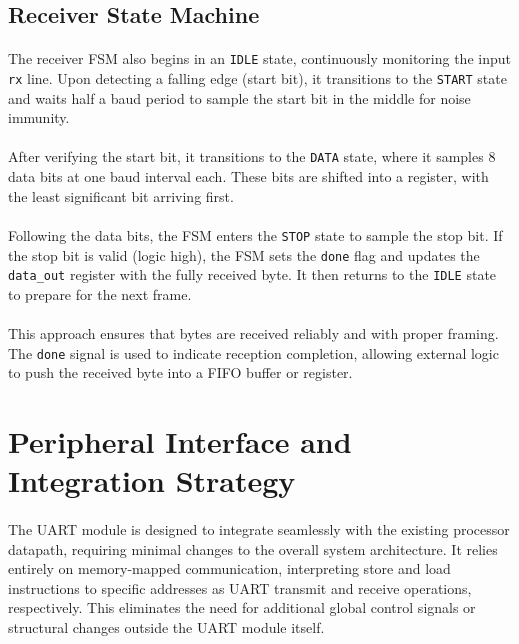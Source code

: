 \documentclass[12pt]{report}
\begin{document}
\subsection{Receiver State Machine}

\paragraph{}
The receiver FSM also begins in an \texttt{IDLE} state, continuously monitoring the input \texttt{rx} line. Upon detecting a falling edge (start bit), it transitions to the \texttt{START} state and waits half a baud period to sample the start bit in the middle for noise immunity.

\paragraph{}
After verifying the start bit, it transitions to the \texttt{DATA} state, where it samples 8 data bits at one baud interval each. These bits are shifted into a register, with the least significant bit arriving first.

\paragraph{}
Following the data bits, the FSM enters the \texttt{STOP} state to sample the stop bit. If the stop bit is valid (logic high), the FSM sets the \texttt{done} flag and updates the \texttt{data\_out} register with the fully received byte. It then returns to the \texttt{IDLE} state to prepare for the next frame.

\paragraph{}
This approach ensures that bytes are received reliably and with proper framing. The \texttt{done} signal is used to indicate reception completion, allowing external logic to push the received byte into a FIFO buffer or register.

\section{Peripheral Interface and Integration Strategy}

\paragraph{}
The UART module is designed to integrate seamlessly with the existing processor datapath, requiring minimal changes to the overall system architecture. It relies entirely on memory-mapped communication, interpreting store and load instructions to specific addresses as UART transmit and receive operations, respectively. This eliminates the need for additional global control signals or structural changes outside the UART module itself.
\end{document}
